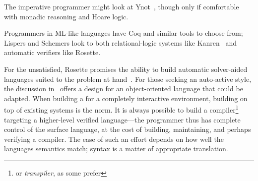 The imperative programmer might look at Ynot~\cite{Nanevski08ynot:reasoning},
though only if comfortable with monadic reasoning and Hoare logic.

Programmers in ML-like languages have Coq and similar tools to choose from;
Lispers and Schemers look to both relational-logic systems like
Kanren~\cite{Byrd_2009} and automatic verifiers like Rosette.

For the unsatisfied, Rosette promises the ability to build automatic
solver-aided languages suited to the problem at hand~\cite{Torlak_2013}. For
those seeking an auto-active style, the discussion
in~\cite{leino2008specification} offers a design for an object-oriented language
that could be adapted. When building a for a completely interactive environment,
building on top of existing systems is the norm. It is always possible to build
a compiler\footnote{or \emph{transpiler}, as some prefer} targeting a
higher-level verified language---the programmer thus has complete control of the
surface language, at the cost of building, maintaining, and perhaps verifying a
compiler. The ease of such an effort depends on how well the languages semantics
match; syntax is a matter of appropriate translation.
